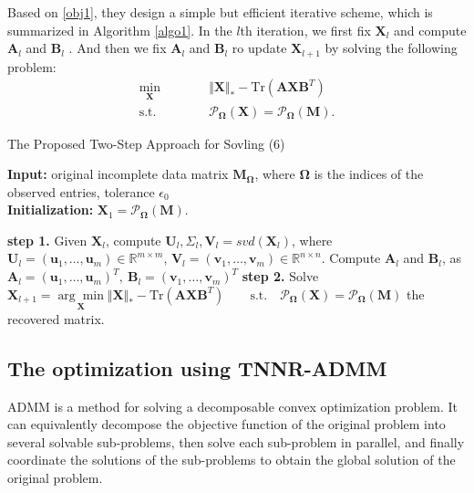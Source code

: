 \documentclass{article}
\begin{document}
{Based on \eqref{obj1},  they design a simple but efficient iterative scheme, which is summarized in Algorithm \ref{algo1}. In the $l$th iteration, we first fix $\mathbf X_l$ and compute $\mathbf A_l$ and $\mathbf B_l$ . And then we fix $\mathbf A_l$ and $\mathbf B_l$ ro update $\mathbf X_{l+1}$ by  solving the following problem:
\begin{equation}
\begin{aligned}
    \underset{\mathbf X}{\min}\qquad&\quad \Vert\mathbf X \Vert_* - \text{Tr}(\mathbf A\mathbf X\mathbf B^T) \\
    \text{s.t.}\qquad&\quad   \mathcal{P}_{\mathbf\Omega}(\mathbf X) =  \mathcal{P}_{\mathbf\Omega}(\mathbf M).
\end{aligned}\label{obj2}
\end{equation}

\begin{algorithm}[t]
    \caption{The Proposed Two-Step Approach for Sovling (6)}
    \label{algo1}
    \textbf{Input:} original incomplete data matrix $\mathbf M_{\mathbf\Omega}$, where $\mathbf \Omega$ is the indices of the observed entries, tolerance $\epsilon_0$ \\
    \textbf{Initialization:} $\mathbf X_1 = \mathcal{P}_{\mathbf\Omega}(\mathbf M)$. 
    \begin{algorithmic}
        \Repeat 
        \State \textbf{step 1.} Given $\mathbf X_l$, compute $\mathbf U_l, \mathbf \varSigma_l, \mathbf V_l = svd(\mathbf X_l)$, 
        \State where $\mathbf U_l = (\bm u_1,\dots,\bm u_m) \in \mathbb{R}^{m \times m}$, $\mathbf V_l = (\bm v_1,\dots,\bm v_m) \in \mathbb{R}^{n \times n}$. 
        \State Compute $\mathbf A_l$ and $\mathbf B_l$, as $\mathbf A_l = (\bm u_1,\dots,\bm u_m)^T, \ \mathbf B_l = (\bm v_1,\dots,\bm v_m)^T$
        \State \textbf{step 2.} Solve $\mathbf X_{l+1} = \underset{\mathbf X}{\arg\min} \Vert\mathbf X \Vert_* - \text{Tr}(\mathbf A\mathbf X\mathbf B^T) \qquad \text{s.t.} \quad \mathcal{P}_{\mathbf\Omega}(\mathbf X) =  \mathcal{P}_{\mathbf\Omega}(\mathbf M)$ 
        \State \Return the recovered matrix.
    \end{algorithmic}
\end{algorithm}



\subsection{The optimization using TNNR-ADMM}
ADMM is a method for solving a decomposable convex optimization problem. It can equivalently decompose the objective function of the original problem into several solvable sub-problems, then solve each sub-problem in parallel, and finally coordinate the solutions of the sub-problems to obtain the global solution of the original problem.

}
\end{document}
